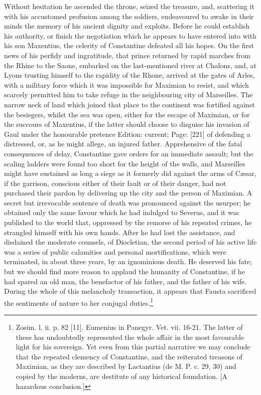 Without hesitation he ascended the throne, seized the treasure, and, scattering it with his accustomed profusion among the soldiers, endeavoured to awake in their minds the memory of his ancient dignity and exploits. Before he could establish his authority, or finish the negotiation which he appears to have entered into with his son Maxentius, the celerity of Constantine defeated all his hopes. On the first news of his perfidy and ingratitude, that prince returned by rapid marches from the Rhine to the Saone, embarked on the last-mentioned river at Chalons, and, at Lyons trusting himself to the rapidity of the Rhone, arrived at the gates of Arles, with a military force which it was impossible for Maximian to resist, and which scarcely permitted him to take refuge in the neighbouring city of Marseilles. The narrow neck of land which joined that place to the continent was fortified against the besiegers, whilst the sea was open, either for the escape of Maximian, or for the succours of Maxentius, if the latter should choose to disguise his invasion of Gaul under the honourable pretence Edition: current; Page: [221] of defending a distressed, or, as he might allege, an injured father. Apprehensive of the fatal consequences of delay, Constantine gave orders for an immediate assault; but the scaling ladders were found too short for the height of the walls, and Marseilles might have sustained as long a siege as it formerly did against the arms of Cæsar, if the garrison, conscious either of their fault or of their danger, had not purchased their pardon by delivering up the city and the person of Maximian. A secret but irrevocable sentence of death was pronounced against the usurper; he obtained only the same favour which he had indulged to Severus, and it was published to the world that, oppressed by the remorse of his repeated crimes, he strangled himself with his own hands. After he had lost the assistance, and disdained the moderate counsels, of Diocletian, the second period of his active life was a series of public calamities and personal mortifications, which were terminated, in about three years, by an ignominious death. He deserved his fate; but we should find more reason to applaud the humanity of Constantine, if he had spared an old man, the benefactor of his father, and the father of his wife. During the whole of this melancholy transaction, it appears that Fausta sacrificed the sentiments of nature to her conjugal duties.\footnote{Zosim. l. ii. p. 82 [11]. Eumenius in Panegyr. Vet. vii. 16-21. The latter of these has undoubtedly represented the whole affair in the most favourable light for his sovereign. Yet even from this partial narrative we may conclude that the repeated clemency of Constantine, and the reiterated treasons of Maximian, as they are described by Lactantius (de M. P. c. 29, 30) and copied by the moderns, are destitute of any historical foundation. [A hazardous conclusion.]}

